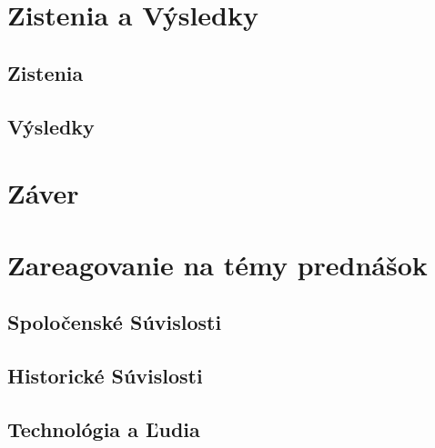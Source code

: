 \documentclass[10pt,oneside,slovak,a4paper]{article}
\begin{document}
\section{Zistenia a Výsledky}\label{zistenia_vysledky}
\subsection{Zistenia}\label{zistenia}
\subsection{Výsledky}\label{vysledky}
\section{Záver}\label{zaver}
\section{Zareagovanie na témy prednášok}\label{reakcia}
\subsection{Spoločenské Súvislosti}\label{reakcia:1}
\subsection{Historické Súvislosti}\label{reakcia:2}
\subsection{Technológia a Ľudia}\label{reakcia:3}


\end{document}
